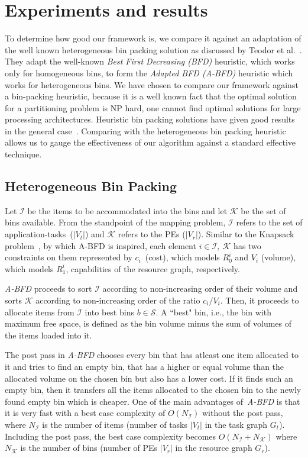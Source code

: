 \section{Experiments and results}
\label{sec:experiments-results}

To determine how good our framework is, we compare it against an
adaptation of the well known heterogeneous bin packing solution as
discussed by Teodor et al.~\cite{tcra11}. They adapt the well-known
\textit{Best First Decreasing (BFD)} heuristic, which works only for
homogeneous bins, to form the \textit{Adapted BFD (A-BFD)} heuristic
which works for heterogeneous bins. We have chosen to compare our
framework against a bin-packing heuristic, because it is a well known
fact that the optimal solution for a partitioning problem is NP hard,
one cannot find optimal solutions for large processing
architectures. Heuristic bin packing solutions have given good results
in the general case~\cite{ecof78}. Comparing with the heterogeneous bin
packing heuristic allows us to gauge the effectiveness of our algorithm
against a standard effective technique.

\subsection{Heterogeneous Bin Packing}

Let $\mathcal{I}$ be the items to be accommodated into the bins and let
$\mathcal{K}$ be the set of bins available.  From the standpoint of the
mapping problem, $\mathcal{I}$ refers to the set of
\mbox{application-tasks ($|V_t|$)} and $\mathcal{K}$ refers to the PEs
($|V_r|$). Similar to the Knapsack problem~\cite{sski08}, by which A-BFD
is inspired, each element $i \in \mathcal{I},\ \mathcal{K}$ has two
constraints on them represented by \mbox{$c_i$ (cost)}, which models
$R^i_0$ and $V_i$ (volume), which models $R^i_1$, capabilities of the
resource graph, respectively.

\textit{A-BFD} proceeds to sort $\mathcal{I}$ according to
non-increasing order of their volume and sorts $\mathcal{K}$ according
to non-increasing order of the ratio $c_i/V_i$. Then, it proceeds to
allocate items from $\mathcal{I}$ into best bins $b \in \mathcal{S}$. A
``best" bin, i.e., the bin with maximum free space, is defined as the
bin volume minus the sum of volumes of the items loaded into
it.

The post pass in \textit{A-BFD} chooses every bin that has atleast one
item allocated to it and tries to find an empty bin, that has a higher
or equal volume than the allocated volume on the chosen bin but also has
a lower cost. If it finds such an empty bin, then it transfers all the
items allocated to the chosen bin to the newly found empty bin which is
cheaper. One of the main advantages of\ \textit{A-BFD} is that it is
very fast with a best case complexity of $O(N_\mathcal{I})$ without the
post pass, where $N_\mathcal{I}$ is the number of items (number of tasks
$|V_t|$ in the task graph $G_t$). Including the post pass, the best case
complexity becomes $O(N_\mathcal{I} + N_\mathcal{K})$ where
$N_\mathcal{K}$ is the number of bins (number of PEs $|V_r|$ in the
resource graph $G_r$).

